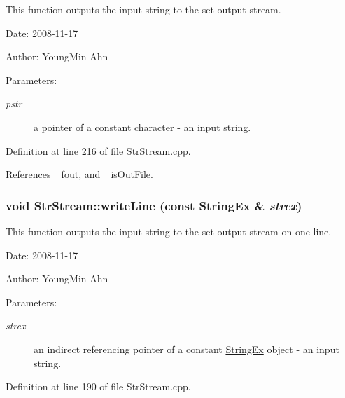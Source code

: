 This function outputs the input string to the set output stream. 

\begin{Desc}
\item[Date:]2008-11-17 \end{Desc}
\begin{Desc}
\item[Author:]YoungMin Ahn \end{Desc}
\begin{Desc}
\item[Parameters:]
\begin{description}
\item[{\em pstr}]a pointer of a constant character - an input string. \end{description}
\end{Desc}


Definition at line 216 of file StrStream.cpp.

References \_\-fout, and \_\-isOutFile.\hypertarget{classkmaOrange_1_1StrStream_04f651a33a14034c003763cd46ce7920}{
\subsubsection[{writeLine}]{\setlength{\rightskip}{0pt plus 5cm}void StrStream::writeLine (const {\bf StringEx} \& {\em strex})}}
\label{classkmaOrange_1_1StrStream_04f651a33a14034c003763cd46ce7920}


This function outputs the input string to the set output stream on one line. 

\begin{Desc}
\item[Date:]2008-11-17 \end{Desc}
\begin{Desc}
\item[Author:]YoungMin Ahn \end{Desc}
\begin{Desc}
\item[Parameters:]
\begin{description}
\item[{\em strex}]an indirect referencing pointer of a constant \hyperlink{classStringEx}{StringEx} object - an input string. \end{description}
\end{Desc}


Definition at line 190 of file StrStream.cpp.

